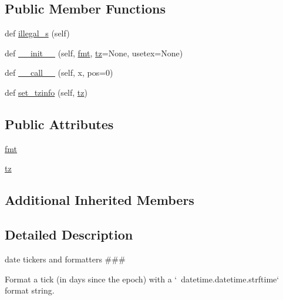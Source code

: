 \subsection*{Public Member Functions}
\begin{DoxyCompactItemize}
\item 
def \hyperlink{classmatplotlib_1_1dates_1_1DateFormatter_a5ee2ef633053d49f74bb8a5084ca6ca1}{illegal\+\_\+s} (self)
\item 
def \hyperlink{classmatplotlib_1_1dates_1_1DateFormatter_ae4cd221d75f6aac94f1304fcb96c070e}{\+\_\+\+\_\+init\+\_\+\+\_\+} (self, \hyperlink{classmatplotlib_1_1dates_1_1DateFormatter_a5f6b043184c536cbbadda07ad7678ca9}{fmt}, \hyperlink{classmatplotlib_1_1dates_1_1DateFormatter_a339b6db1db974758187da8c3f98319c7}{tz}=None, usetex=None)
\item 
def \hyperlink{classmatplotlib_1_1dates_1_1DateFormatter_a3dbcd2731367333668a6f5e1aa464026}{\+\_\+\+\_\+call\+\_\+\+\_\+} (self, x, pos=0)
\item 
def \hyperlink{classmatplotlib_1_1dates_1_1DateFormatter_a5d7ab6c2861789a7f3143d92108adad2}{set\+\_\+tzinfo} (self, \hyperlink{classmatplotlib_1_1dates_1_1DateFormatter_a339b6db1db974758187da8c3f98319c7}{tz})
\end{DoxyCompactItemize}
\subsection*{Public Attributes}
\begin{DoxyCompactItemize}
\item 
\hyperlink{classmatplotlib_1_1dates_1_1DateFormatter_a5f6b043184c536cbbadda07ad7678ca9}{fmt}
\item 
\hyperlink{classmatplotlib_1_1dates_1_1DateFormatter_a339b6db1db974758187da8c3f98319c7}{tz}
\end{DoxyCompactItemize}
\subsection*{Additional Inherited Members}


\subsection{Detailed Description}
date tickers and formatters \#\#\# 

\begin{DoxyVerb}Format a tick (in days since the epoch) with a
`~datetime.datetime.strftime` format string.
\end{DoxyVerb}
 

